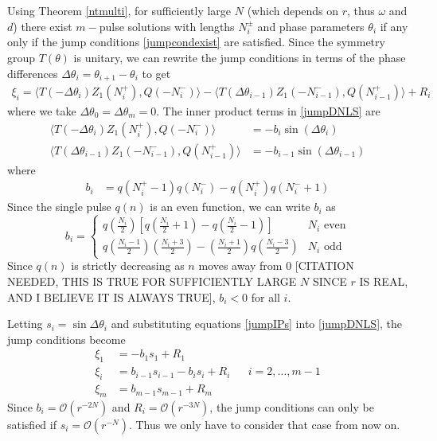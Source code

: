 \documentclass[12pt]{article}
\begin{document}
Using Theorem \ref{ntmulti}, for sufficiently large $N$ (which depends on $r$, thus $\omega$ and $d$) there exist $m-$pulse solutions with lengths $N_i^\pm$ and phase parameters $\theta_i$ if any only if the jump conditions \eqref{jumpcondexist} are satisfied. Since the symmetry group $T(\theta)$ is unitary, we can rewrite the jump conditions in terms of the phase differences $\Delta \theta_i = \theta_{i+1} - \theta_i$ to get
\begin{align}\label{jumpDNLS}
\xi_i = \langle T(-\Delta \theta_i) Z_1(N_i^+), Q(-N_i^-) \rangle
- \langle T(\Delta \theta_{i-1}) Z_1(-N_{i-1}^-), Q(N_{i-1}^+) \rangle + R_i
\end{align}
where we take $\Delta \theta_0 = \Delta \theta_m = 0$. The inner product terms in \eqref{jumpDNLS} are
\begin{equation}\label{jumpIPs}
\begin{aligned}
\langle T(-\Delta\theta_i) Z_1(N_i^+), Q(-N_i^-) \rangle 
&= -b_i \sin(\Delta\theta_i) \\
\langle T(\Delta\theta_{i-1}) Z_1(-N_{i-1}^-), Q(N_{i-1}^+) \rangle &= -b_{i-1} \sin(\Delta\theta_{i-1})
\end{aligned}
\end{equation}
where 
\begin{align*}
b_i &= q(N_i^+ - 1)q(N_i^-) - q(N_i^+)q(N_i^- + 1)
\end{align*}
Since the single pulse $q(n)$ is an even function, we can write $b_i$ as
\begin{equation}\label{bieq}
b_i = \begin{cases}
q\left(\frac{N_i}{2}\right) \left[ q\left(\frac{N_i}{2} + 1\right) - q\left(\frac{N_i}{2} - 1\right) \right] & N_i \text{ even} \\
q\left(\frac{N_i-1}{2}\right)\left(\frac{N_i+3}{2}\right) 
- \left(\frac{N_i+1}{2}\right)q\left(\frac{N_i-3}{2}\right) & N_i \text{ odd}
\end{cases}
\end{equation}
Since $q(n)$ is strictly decreasing as $n$ moves away from 0 [CITATION NEEDED, THIS IS TRUE FOR SUFFICIENTLY LARGE $N$ SINCE $r$ IS REAL, AND I BELIEVE IT IS ALWAYS TRUE], $b_i < 0$ for all $i$. 

Letting $s_i = \sin{\Delta\theta_i}$ and substituting equations \eqref{jumpIPs} into \eqref{jumpDNLS}, the jump conditions become
\begin{equation}\label{jumpDNLS2}
\begin{aligned}
\xi_1 &= -b_1 s_1 + R_1 \\
\xi_i &= b_{i-1} s_{i-1} - b_i s_i + R_i
&& i = 2, \dots, m-1 \\
\xi_m &= b_{m-1} s_{m-1} + R_m
\end{aligned}
\end{equation}
Since $b_i = \mathcal{O}(r^{-2N})$ and $R_i = \mathcal{O}(r^{-3N})$, the jump conditions can only be satisfied if $s_i = \mathcal{O}(r^{-N})$. Thus we only have to consider that case from now on. 
 
\end{document}
